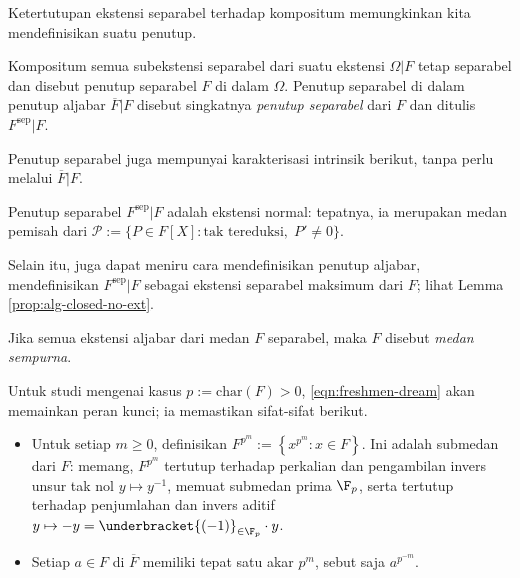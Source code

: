 Ketertutupan ekstensi separabel terhadap kompositum memungkinkan kita mendefinisikan suatu penutup.
\begin{definition}\label{def:sep-closure}
	Kompositum semua subekstensi separabel dari suatu ekstensi $\Omega|F$ tetap separabel dan disebut penutup separabel $F$ di dalam $\Omega$. Penutup separabel di dalam penutup aljabar $\overline{F}|F$ disebut singkatnya \emph{penutup separabel} dari $F$ dan ditulis $F^\mathrm{sep}|F$.
\end{definition}
Penutup separabel juga mempunyai karakterisasi intrinsik berikut, tanpa perlu melalui $\overline{F}|F$.
\begin{proposition}
	Penutup separabel $F^\mathrm{sep}|F$ adalah ekstensi normal: tepatnya, ia merupakan medan pemisah dari $\mathcal{P} := \{P \in F[X]: \text{tak tereduksi},\; P' \neq 0 \}$.
\end{proposition}
Selain itu, juga dapat meniru cara mendefinisikan penutup aljabar, mendefinisikan $F^\text{sep}|F$ sebagai ekstensi separabel maksimum dari $F$; lihat Lemma \ref{prop:alg-closed-no-ext}.

\begin{definition}\label{def:perfect-field}
	Jika semua ekstensi aljabar dari medan $F$ separabel, maka $F$ disebut \emph{medan sempurna}.
\end{definition}

Untuk studi mengenai kasus $p := \text{char}(F) > 0$, \eqref{eqn:freshmen-dream} akan memainkan peran kunci; ia memastikan sifat-sifat berikut.
\begin{itemize}
	\item Untuk setiap $m \geq 0$, definisikan $F^{p^m} := \left\{x^{p^m} : x \in F \right\}$. Ini adalah submedan dari $F$: memang, $F^{p^m}$ tertutup terhadap perkalian dan pengambilan invers unsur tak nol $y \mapsto y^{-1}$, memuat submedan prima $\F_p$, serta tertutup terhadap penjumlahan dan invers aditif $y \mapsto -y = \underbracket{(-1)}_{\in \F_p} \cdot y$.
	\item Setiap $a \in F$ di $\overline{F}$ memiliki tepat satu akar $p^m$, sebut saja $a^{p^{-m}}$.
\end{itemize}

